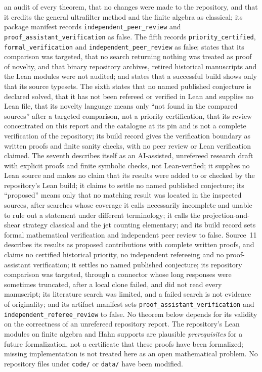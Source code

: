 \documentclass[11pt]{article}
\theoremstyle{plain}
\theoremstyle{plain}
\theoremstyle{plain}
\theoremstyle{definition}
\theoremstyle{definition}
\theoremstyle{definition}
\theoremstyle{definition}
\theoremstyle{remark}
\begin{document}
an audit of every theorem, that no changes were made to the repository, and
that it credits the general ultrafilter method and the finite algebra as
classical; its package manifest records \texttt{independent\_peer\_review}
and \texttt{proof\_assistant\_verification} as false. The fifth records
\texttt{priority\_certified}, \texttt{formal\_verification} and
\texttt{independent\_peer\_review} as false; states that its comparison was
targeted, that no search returning nothing was treated as proof of novelty,
and that binary repository archives, retired historical manuscripts and the
Lean modules were not audited; and states that a successful build shows only
that its source typesets. The sixth states that no named published conjecture
is declared solved, that it has not been refereed or verified in Lean and
supplies no Lean file, that its novelty language means only ``not found in
the compared sources'' after a targeted comparison, not a priority
certification, that its review concentrated on this report and the
catalogue at its pin and is not a complete verification of the repository;
its build record gives the verification boundary as written proofs and
finite sanity checks, with no peer review or Lean verification claimed. The
seventh describes itself as an AI-assisted, unrefereed research draft with
explicit proofs and finite symbolic checks, not Lean-verified; it supplies no
Lean source and makes no claim that its results were added to or checked by
the repository's Lean build; it claims to settle no named published
conjecture; its ``proposed'' means only that no matching result was located in
the inspected sources, after searches whose coverage it calls necessarily
incomplete and unable to rule out a statement under different terminology; it
calls the projection-and-shear strategy classical and the jet counting
elementary; and its build record sets formal mathematical verification and
independent peer review to false.
Source~11 describes its results as proposed contributions with complete
written proofs, and claims no certified historical priority, no independent
refereeing and no proof-assistant verification; it settles no named published
conjecture; its repository comparison was targeted, through a connector whose
long responses were sometimes truncated, after a local clone failed, and did
not read every manuscript; its literature search was limited, and a failed
search is not evidence of originality; and its artifact manifest sets
\texttt{proof\_assistant\_verification} and
\texttt{independent\_referee\_review} to false.
No theorem below depends for its validity on the
correctness of an unrefereed repository report. The repository's Lean modules
on finite algebra and Hahn supports are plausible \emph{prerequisites} for a
future formalization, not a certificate that these proofs have been
formalized; missing implementation is not treated here as an open
mathematical problem. No repository files under \texttt{code/} or
\texttt{data/} have been modified.
\end{document}
